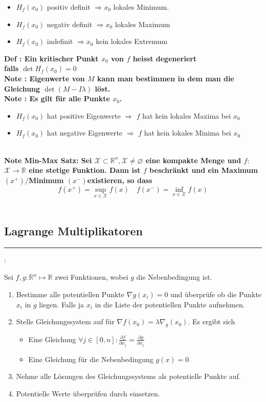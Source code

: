 \documentclass[7pt,landscape, margin = 0.1mm]{article}
\newcommand*{\mysubsection}[1]{\vspace{-2mm}\color{chaptercolor}\subsection{ #1 }
\vspace{-1mm}\hrule\vspace{1.5mm}\color{black}
\vspace{2mm}}
\newcommand{\COL}[1]{ \color{chaptercolor} \bf{#1}\color{black}     \\}
\newcommand{\KRZ}[2]{\vspace{1mm} \hline \vspace{1mm} \color{chaptercolor}{RC #1}:\color{black} \   \hspace{0.2cm}\vspace{1mm}   {\begin{minipage}{20em}
#2 \end{minipage}} \vspace{1mm}  \hline \vspace{1mm}  \\}
\newcommand{\DEF}[2]{\color{chaptercolor}\bf{Def #1}:\color{black}    \hspace{0.2cm} #2 \\}
\newcommand{\NOTE}[2]{\color{chaptercolor}\bf{Note #1}:\color{black}    \hspace{0.2cm} #2 \\}
\begin{document}
\begin{multicols}{4}
\begin{flushleft}
{\begin{itemize}
\item $H_f\left(x_0\right)$ positiv definit $\Rightarrow x_0$ lokales Minimum.
\item $H_f\left(x_0\right)$ negativ definit $\Rightarrow x_0$ lokales Maximum
\item $H_f\left(x_0\right)$ indefinit $\Rightarrow x_0$ kein lokales Extremum
 \end{itemize}
}
\DEF{}{Ein kritischer Punkt $x_0$ von $f$ heisst \COL{degeneriert} falls $\operatorname{det} H_f\left(x_0\right)=0$}



\NOTE{}{Eigenwerte von $M$ kann man bestimmen in dem man die Gleichung $\det(M-I\lambda)$ löst.}

\NOTE{}{Es gilt für alle Punkte $x_{0}$. 
\begin{itemize}

\item $H_{f}(x_0)$ hat positive Eigenwerte $\Rightarrow$ $f$ hat kein lokales Maxima bei $x_{0}$
\item $H_{f}(x_0)$ hat negative Eigenwerte $\Rightarrow$ $f$  hat kein lokales Minima bei $x_{0}$

\end{itemize}}


\NOTE{Min-Max Satz}{
Sei $\mathcal{X} \subset \mathbb{R}^n, \mathcal{X} \neq \varnothing$ eine kompakte Menge und $f:$ $\mathcal{X} \rightarrow \mathbb{R}$ eine stetige Funktion. Dann ist $f$ beschränkt und ein Maximum $\left(x^{+}\right) /$Minimum $\left(x^{-}\right)$existieren, so dass
$$
f\left(x^{+}\right)=\sup _{x \in \mathcal{X}} f(x) \quad f\left(x^{-}\right)=\inf _{x \in \mathcal{X}} f(x)
$$}

\mysubsection{Lagrange Multiplikatoren}

\KRZ{Lagrange Multiplikatoren}{
Sei $f,g: \mathbb{R}^n \mapsto \mathbb{R}$ zwei Funktionen, wobei $g$ die Nebenbedingung ist.
\begin{enumerate}


\item Bestimme alle potentiellen Punkte $\nabla g(x_i)=0$ und überprüfe ob die Punkte $x_i$ in $g$ liegen. Falls ja $x_i$ in die Liste der potentiellen Punkte aufnehmen.
\item Stelle Gleichungssystem auf für $\nabla f\left(x_0\right)=\lambda \nabla_g\left(x_0\right)$. Es ergibt sich
\begin{itemize}
\item Eine Gleichung $\forall j \in [0,n]:  \frac{\partial f}{\partial x_j}=\frac{\partial g}{\partial x_j}$
\item Eine Gleichung für die Nebenbedingung $g(x)=0$
\end{itemize}
\item Nehme alle Lösungen des Gleichungssystems als potentielle Punkte auf.
\item Potentielle Werte überprüfen durch einsetzen.
\end{enumerate}


}
\end{flushleft}
\end{multicols}
\end{document}
